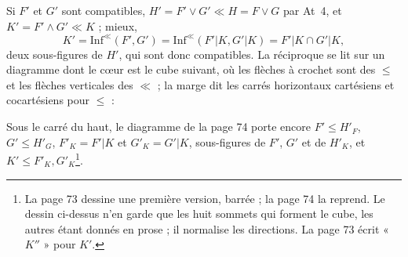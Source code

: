 \documentclass[11pt,a4paper]{article}
\begin{document}
Si $F'$ et $G'$ sont compatibles, $H' = F' \vee G' \ll H = F \vee G$ par At~4, et
$K' = F' \wedge G' \ll K$ ; mieux,
\[
K' = \mathrm{Inf}^{\ll}(F', G') = \mathrm{Inf}^{\ll}(F'|K, G'|K) = F'|K \cap
G'|K ,
\]
deux sous-figures de $H'$, qui sont donc compatibles. La réciproque se lit sur un
diagramme dont le cœur est le cube suivant, où les flèches à crochet sont des
$\leq$ et les flèches verticales des $\ll$ ; la marge dit les carrés horizontaux
cartésiens et cocartésiens pour $\leq$ :


Sous le carré du haut, le diagramme de la page 74 porte encore $F' \leq H'_{F}$,
$G' \leq H'_{G}$, $F'_{K} = F'|K$ et $G'_{K} = G'|K$, sous-figures de $F'$, $G'$
et de $H'_{K}$, et $K' \leq F'_{K}, G'_{K}$\footnote{La page 73 dessine une
première version, barrée ; la page 74 la reprend. Le dessin ci-dessus n'en garde
que les huit sommets qui forment le cube, les autres étant donnés en prose ; il
normalise les directions. La page 73 écrit « $K''$ » pour $K'$.}.
\end{document}
